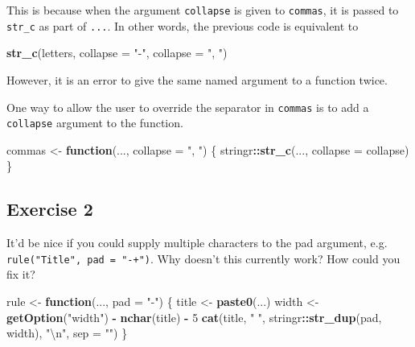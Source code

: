 \documentclass[]{book}
\newenvironment{Shaded}{\begin{snugshade}}{\end{snugshade}}
\newcommand{\CharTok}[1]{\textcolor[rgb]{0.31,0.60,0.02}{#1}}
\newcommand{\ControlFlowTok}[1]{\textcolor[rgb]{0.13,0.29,0.53}{\textbf{#1}}}
\newcommand{\DataTypeTok}[1]{\textcolor[rgb]{0.13,0.29,0.53}{#1}}
\newcommand{\DecValTok}[1]{\textcolor[rgb]{0.00,0.00,0.81}{#1}}
\newcommand{\KeywordTok}[1]{\textcolor[rgb]{0.13,0.29,0.53}{\textbf{#1}}}
\newcommand{\NormalTok}[1]{#1}
\newcommand{\OperatorTok}[1]{\textcolor[rgb]{0.81,0.36,0.00}{\textbf{#1}}}
\newcommand{\StringTok}[1]{\textcolor[rgb]{0.31,0.60,0.02}{#1}}
\theoremstyle{definition}
\theoremstyle{definition}
\theoremstyle{definition}
\theoremstyle{remark}
\begin{document}
This is because when the argument \texttt{collapse} is given to
\texttt{commas}, it is passed to \texttt{str\_c} as part of
\texttt{...}. In other words, the previous code is equivalent to

\begin{Shaded}
\begin{Highlighting}[]
\KeywordTok{str_c}\NormalTok{(letters, }\DataTypeTok{collapse =} \StringTok{"-"}\NormalTok{, }\DataTypeTok{collapse =} \StringTok{", "}\NormalTok{)}
\end{Highlighting}
\end{Shaded}

However, it is an error to give the same named argument to a function
twice.

One way to allow the user to override the separator in \texttt{commas}
is to add a \texttt{collapse} argument to the function.

\begin{Shaded}
\begin{Highlighting}[]
\NormalTok{commas <-}\StringTok{ }\ControlFlowTok{function}\NormalTok{(..., }\DataTypeTok{collapse =} \StringTok{", "}\NormalTok{) \{}
\NormalTok{  stringr}\OperatorTok{::}\KeywordTok{str_c}\NormalTok{(..., }\DataTypeTok{collapse =}\NormalTok{ collapse)}
\NormalTok{\}}
\end{Highlighting}
\end{Shaded}

\hypertarget{exercise-2-46}{%
\subsection{Exercise 2}\label{exercise-2-46}}

It'd be nice if you could supply multiple characters to the pad
argument, e.g. \texttt{rule("Title",\ pad\ =\ "-+")}. Why doesn't this
currently work? How could you fix it?

\begin{Shaded}
\begin{Highlighting}[]
\NormalTok{rule <-}\StringTok{ }\ControlFlowTok{function}\NormalTok{(..., }\DataTypeTok{pad =} \StringTok{"-"}\NormalTok{) \{}
\NormalTok{  title <-}\StringTok{ }\KeywordTok{paste0}\NormalTok{(...)}
\NormalTok{  width <-}\StringTok{ }\KeywordTok{getOption}\NormalTok{(}\StringTok{"width"}\NormalTok{) }\OperatorTok{-}\StringTok{ }\KeywordTok{nchar}\NormalTok{(title) }\OperatorTok{-}\StringTok{ }\DecValTok{5}
  \KeywordTok{cat}\NormalTok{(title, }\StringTok{" "}\NormalTok{, stringr}\OperatorTok{::}\KeywordTok{str_dup}\NormalTok{(pad, width), }\StringTok{"}\CharTok{\textbackslash{}n}\StringTok{"}\NormalTok{, }\DataTypeTok{sep =} \StringTok{""}\NormalTok{)}
\NormalTok{\}}
\end{Highlighting}
\end{Shaded}
\end{document}

